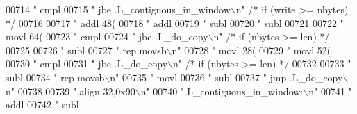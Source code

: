 \begin{DoxyCode}
{{{{{{{{{{{{{{{{{{{{{{{{{{{{{{{{{{{{{{{{{{{{{{{{{{{{{{{{{{{{{{{{{{{{{{{{{{{{{{{{{{{{{{{{{{{{{{{{{{{{{{{{{{{{{{{{{{{{{{{{{{{{{{{{{{{{{{{{{{{{{{{{{{{{{{{{{{{{{{{{{{{{{{{{{{{{{{{{{{{{{{{{{{{{{{{{{{{{{{{{{{{{{{{{{{{{{{{{{{{{{{{{{{{{{{{{{{{{{{{{{{{{{{{{{{{{{{{{{{{{{{{{{{{{{{{{{{{{{{{{{{{{{{{{{{{{{{{{{{{{{{{{{{{{{{{{{{{{{{{{{{{00714 \textcolor{stringliteral}{"        cmpl    %
00715 \textcolor{stringliteral}{"        jbe     .L\_contiguous\_in\_window\(\backslash\)n"} \textcolor{comment}{/* if (write >= nbytes) */}
00716 
00717 \textcolor{stringliteral}{"        addl    48(%
00718 \textcolor{stringliteral}{"        addl    %
00719 \textcolor{stringliteral}{"        subl    %
00720 \textcolor{stringliteral}{"        subl    %
00721 
00722 \textcolor{stringliteral}{"        movl    64(%
00723 \textcolor{stringliteral}{"        cmpl    %
00724 \textcolor{stringliteral}{"        jbe     .L\_do\_copy\(\backslash\)n"}           \textcolor{comment}{/* if (nbytes >= len) */}
00725 
00726 \textcolor{stringliteral}{"        subl    %
00727 \textcolor{stringliteral}{"        rep     movsb\(\backslash\)n"}
00728 \textcolor{stringliteral}{"        movl    28(%
00729 \textcolor{stringliteral}{"        movl    52(%
00730 \textcolor{stringliteral}{"        cmpl    %
00731 \textcolor{stringliteral}{"        jbe     .L\_do\_copy\(\backslash\)n"}           \textcolor{comment}{/* if (nbytes >= len) */}
00732 
00733 \textcolor{stringliteral}{"        subl    %
00734 \textcolor{stringliteral}{"        rep     movsb\(\backslash\)n"}
00735 \textcolor{stringliteral}{"        movl    %
00736 \textcolor{stringliteral}{"        subl    %
00737 \textcolor{stringliteral}{"        jmp     .L\_do\_copy\(\backslash\)n"}
00738 
00739 \textcolor{stringliteral}{".align 32,0x90\(\backslash\)n"}
00740 \textcolor{stringliteral}{".L\_contiguous\_in\_window:\(\backslash\)n"}
00741 \textcolor{stringliteral}{"        addl    %
00742 \textcolor{stringliteral}{"        subl    %
}}}}}}}}}}}}}}}}}}}}}}}}}}}}}}}}}}}}}}}}}}}}}}}}}}}}}}}}}}}}}}}}}}}}}}}}}}}}}}}}}}}}}}}}}}}}}}}}}}}}}}}}}}}}}}}}}}}}}}}}}}}}}}}}}}}}}}}}}}}}}}}}}}}}}}}}}}}}}}}}}}}}}}}}}}}}}}}}}}}}}}}}}}}}}}}}}}}}}}}}}}}}}}}}}}}}}}}}}}}}}}}}}}}}}}}}}}}}}}}}}}}}}}}}}}}}}}}}}}}}}}}}}}}}}}}}}}}}}}}}}}}}}}}}}}}}}}}}}}}}}}}}}}}}}}}}}}}}}}}}}}}}}}}}}}}}}}}}}}}
\end{DoxyCode}
